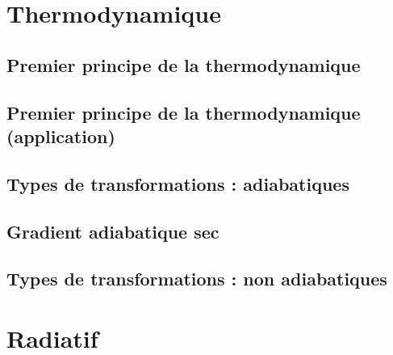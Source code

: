 \documentclass[
        a4paper,
        DIV16,
        10pt,
        cleardoublepage=empty,
        twoside=yes,
        BCOR=8.25mm
        ]{scrbook}
\begin{document}
\chapter{Thermodynamique}

\newpage
\section{Premier principe de la thermodynamique}


\newpage
\section{Premier principe de la thermodynamique (application)}


\newpage
\section{Types de transformations : adiabatiques}


\newpage
\section{Gradient adiabatique sec}


%
%
%

\newpage
\section{Types de transformations : non adiabatiques}


%

\chapter{Radiatif}
\end{document}
